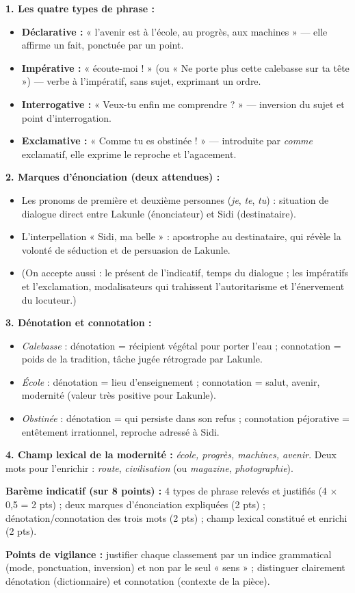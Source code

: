 \documentclass[11pt]{article}
\begin{document}
\begin{corrige}
\textbf{1. Les quatre types de phrase :}
\begin{itemize}
\item \textbf{Déclarative :} « l'avenir est à l'école, au progrès, aux machines » — elle affirme un fait, ponctuée par un point.
\item \textbf{Impérative :} « écoute-moi ! » (ou « Ne porte plus cette calebasse sur ta tête ») — verbe à l'impératif, sans sujet, exprimant un ordre.
\item \textbf{Interrogative :} « Veux-tu enfin me comprendre ? » — inversion du sujet et point d'interrogation.
\item \textbf{Exclamative :} « Comme tu es obstinée ! » — introduite par \emph{comme} exclamatif, elle exprime le reproche et l'agacement.
\end{itemize}

\textbf{2. Marques d'énonciation (deux attendues) :}
\begin{itemize}
\item Les pronoms de première et deuxième personnes (\emph{je}, \emph{te}, \emph{tu}) : situation de dialogue direct entre Lakunle (énonciateur) et Sidi (destinataire).
\item L'interpellation « Sidi, ma belle » : apostrophe au destinataire, qui révèle la volonté de séduction et de persuasion de Lakunle.
\item (On accepte aussi : le présent de l'indicatif, temps du dialogue ; les impératifs et l'exclamation, modalisateurs qui trahissent l'autoritarisme et l'énervement du locuteur.)
\end{itemize}

\textbf{3. Dénotation et connotation :}
\begin{itemize}
\item \emph{Calebasse} : dénotation = récipient végétal pour porter l'eau ; connotation = poids de la tradition, tâche jugée rétrograde par Lakunle.
\item \emph{École} : dénotation = lieu d'enseignement ; connotation = salut, avenir, modernité (valeur très positive pour Lakunle).
\item \emph{Obstinée} : dénotation = qui persiste dans son refus ; connotation péjorative = entêtement irrationnel, reproche adressé à Sidi.
\end{itemize}

\textbf{4. Champ lexical de la modernité :} \emph{école, progrès, machines, avenir}. Deux mots pour l'enrichir : \emph{route}, \emph{civilisation} (ou \emph{magazine}, \emph{photographie}).

\textbf{Barème indicatif (sur 8 points) :} 4 types de phrase relevés et justifiés (4 $\times$ 0,5 = 2 pts) ; deux marques d'énonciation expliquées (2 pts) ; dénotation/connotation des trois mots (2 pts) ; champ lexical constitué et enrichi (2 pts).

\textbf{Points de vigilance :} justifier chaque classement par un indice grammatical (mode, ponctuation, inversion) et non par le seul « sens » ; distinguer clairement dénotation (dictionnaire) et connotation (contexte de la pièce).
\end{corrige}
\end{document}

